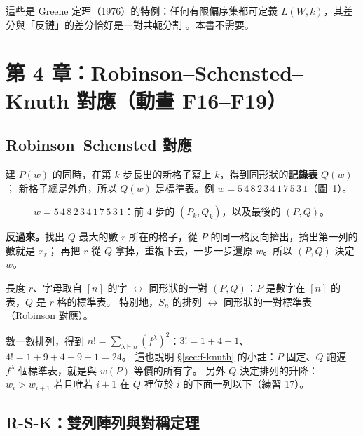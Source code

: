 \begin{notebox}
這些是 Greene 定理（1976）的特例：任何有限偏序集都可定義 $L(W,k)$，其差分與「反鏈」的差分恰好是一對共軛分割 。本書不需要。
\end{notebox}

\section{第 4 章：Robinson–Schensted–Knuth 對應（動畫 F16--F19）}\label{sec:f-ch4}

\subsection{Robinson–Schensted 對應}\label{sec:f-rs}

建 $P(w)$ 的同時，在第 $k$ 步長出的新格子寫上 $k$，得到同形狀的\textbf{記錄表} $Q(w)$ ；
新格子總是外角，所以 $Q(w)$ 是標準表。例 $w=5\,4\,8\,2\,3\,4\,1\,7\,5\,3\,1$（圖~\ref{fig:f-rs}）。

\begin{figure}[H]
\centering
\FulRS
\caption{$w=5\,4\,8\,2\,3\,4\,1\,7\,5\,3\,1$：前 4 步的 $(P_k,Q_k)$，以及最後的 $(P,Q)$。}
\label{fig:f-rs}
\end{figure}

\textbf{反過來。}找出 $Q$ 最大的數 $r$ 所在的格子，從 $P$ 的同一格反向擠出，擠出第一列的數就是 $x_r$；
再把 $r$ 從 $Q$ 拿掉，重複下去，一步一步還原 $w$。所以 $(P,Q)$ 決定 $w$。

\begin{thmbox}
長度 $r$、字母取自 $[n]$ 的字 $\longleftrightarrow$ 同形狀的一對 $(P,Q)$：$P$ 是數字在 $[n]$ 的表，$Q$ 是 $r$ 格的標準表。
特別地，$S_n$ 的排列 $\longleftrightarrow$ 同形狀的一對標準表（Robinson 對應）。
\end{thmbox}

數一數排列，得到 $n!=\sum_{\lambda\vdash n}(f^\lambda)^2$：$3!=1+4+1$、$4!=1+9+4+9+1=24$。
這也說明 \S\ref{sec:f-knuth} 的小註：$P$ 固定、$Q$ 跑遍 $f^\lambda$ 個標準表，就是與 $w(P)$ 等價的所有字。
另外 $Q$ 決定排列的升降：$w_i>w_{i+1}$ 若且唯若 $i+1$ 在 $Q$ 裡位於 $i$ 的下面一列以下（練習 17）。

\subsection{R-S-K：雙列陣列與對稱定理}\label{sec:f-rsk}


